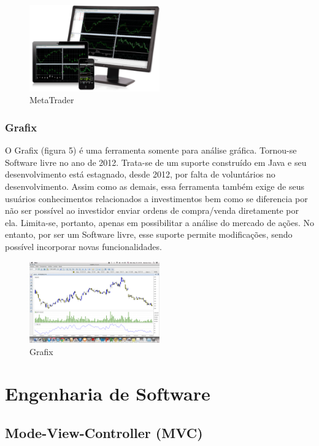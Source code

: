 \begin{figure}[h]
\centering
\label{f04}
\includegraphics[width=0.5\textwidth]{figuras/f04}
\caption{MetaTrader}

\end{figure}


\subsubsection{Grafix}

O Grafix (figura 5) é uma ferramenta somente para análise gráfica. Tornou-se Software livre no ano de 2012. Trata-se de um suporte construído em Java e seu desenvolvimento está estagnado, desde 2012, por falta de voluntários no desenvolvimento. Assim como as demais, essa ferramenta também exige de seus usuários conhecimentos relacionados a investimentos bem como se diferencia por não ser possível ao investidor enviar ordens de compra/venda diretamente por ela. Limita-se, portanto, apenas em possibilitar a análise do mercado de ações. No entanto, por ser um Software livre, esse suporte permite modificações, sendo possível incorporar novas funcionalidades.

\begin{figure}[h]
\centering
\label{f05}
\includegraphics[width=0.5\textwidth]{figuras/f05}
\caption{Grafix}

\end{figure}

\section{Engenharia de Software}
\subsection{Mode-View-Controller (MVC)}

